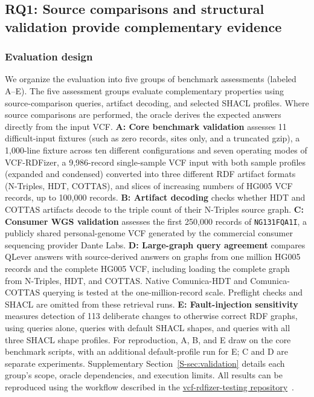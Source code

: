 \documentclass[pdflatex,sn-mathphys-num,referee]{sn-jnl}
\begin{document}
\subsection{RQ1: Source comparisons and structural validation provide complementary evidence}\label{subsec:results-fidelity}
\subsubsection{Evaluation design}\label{subsec:eval-fidelity}
We organize the evaluation into five groups of benchmark assessments (labeled A--E).
The five assessment groups evaluate complementary properties using source-comparison queries, artifact decoding, and selected SHACL profiles.
Where source comparisons are performed, the oracle derives the expected answers directly from the input VCF.
\textbf{A: Core benchmark validation} assesses 11 difficult-input fixtures (such as zero records, sites only, and a truncated gzip), a 1,000-line fixture across ten different configurations and seven operating modes of VCF-RDFizer, a 9,986-record single-sample VCF input with both sample profiles (expanded and condensed) converted into three different RDF artifact formats (N-Triples, HDT, COTTAS), and slices of increasing numbers of HG005 VCF records, up to 100,000 records.
\textbf{B: Artifact decoding} checks whether HDT and COTTAS artifacts decode to the triple count of their N-Triples source graph.
\textbf{C: Consumer WGS validation} assesses the first 250,000 records of \texttt{NG131FQA1I}, a publicly shared personal-genome VCF generated by the commercial consumer sequencing provider Dante Labs.
\textbf{D: Large-graph query agreement} compares QLever answers with source-derived answers on graphs from one million HG005 records and the complete HG005 VCF, including loading the complete graph from N-Triples, HDT, and COTTAS.
Native Comunica-HDT and Comunica-COTTAS querying is tested at the one-million-record scale.
Preflight checks and SHACL are omitted from these retrieval runs.
\textbf{E: Fault-injection sensitivity} measures detection of 113 deliberate changes to otherwise correct RDF graphs, using queries alone, queries with default SHACL shapes, and queries with all three SHACL shape profiles.
For reproduction, A, B, and E draw on the core benchmark scripts, with an additional default-profile run for E; C and D are separate experiments.
Supplementary Section~\ref{S-sec:validation} details each group's scope, oracle dependencies, and execution limits.
All results can be reproduced using the workflow described in the \href{https://github.com/ecrum19/vcf-rdfizer-testing#reproducing-the-results}{vcf-rdfizer-testing repository}~\cite{vcfrdfizer_testing_repo}.
\end{document}
